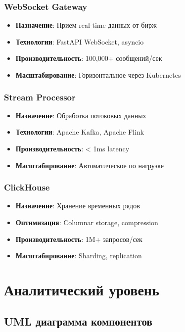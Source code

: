\documentclass[12pt,a4paper]{article}
\begin{document}
\subsubsection{WebSocket Gateway}
\begin{itemize}
    \item \textbf{Назначение}: Прием real-time данных от бирж
    \item \textbf{Технологии}: FastAPI WebSocket, asyncio
    \item \textbf{Производительность}: 100,000+ сообщений/сек
    \item \textbf{Масштабирование}: Горизонтальное через Kubernetes
\end{itemize}

\subsubsection{Stream Processor}
\begin{itemize}
    \item \textbf{Назначение}: Обработка потоковых данных
    \item \textbf{Технологии}: Apache Kafka, Apache Flink
    \item \textbf{Производительность}: < 1ms latency
    \item \textbf{Масштабирование}: Автоматическое по нагрузке
\end{itemize}

\subsubsection{ClickHouse}
\begin{itemize}
    \item \textbf{Назначение}: Хранение временных рядов
    \item \textbf{Оптимизация}: Columnar storage, compression
    \item \textbf{Производительность}: 1M+ запросов/сек
    \item \textbf{Масштабирование}: Sharding, replication
\end{itemize}

\section{Аналитический уровень}

\subsection{UML диаграмма компонентов}
\end{document}
